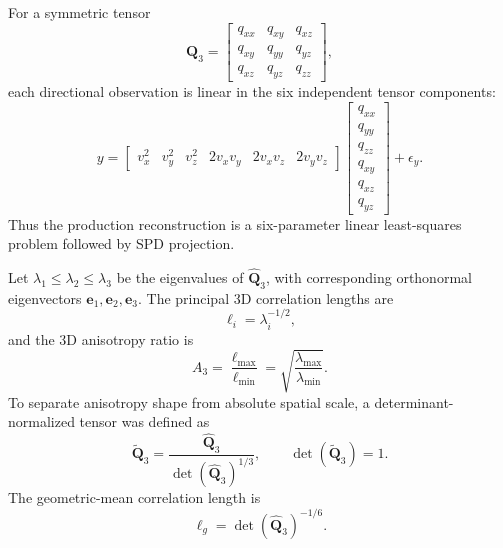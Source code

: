 \documentclass{article}
\begin{document}
For a symmetric tensor
\begin{equation}
    \bm{Q}_{3}
    =
    \begin{bmatrix}
    q_{xx} & q_{xy} & q_{xz}\\
    q_{xy} & q_{yy} & q_{yz}\\
    q_{xz} & q_{yz} & q_{zz}
    \end{bmatrix},
    \label{eq:q3d_matrix}
\end{equation}
each directional observation is linear in the six independent tensor
components:
\begin{equation}
    y
    =
    \begin{bmatrix}
    v_x^2 &
    v_y^2 &
    v_z^2 &
    2v_xv_y &
    2v_xv_z &
    2v_yv_z
    \end{bmatrix}
    \begin{bmatrix}
    q_{xx}\\
    q_{yy}\\
    q_{zz}\\
    q_{xy}\\
    q_{xz}\\
    q_{yz}
    \end{bmatrix}
    +
    \epsilon_y.
    \label{eq:linear_design}
\end{equation}
Thus the production reconstruction is a six-parameter linear least-squares
problem followed by SPD projection.

Let $\lambda_{1}\leq\lambda_{2}\leq\lambda_{3}$ be the eigenvalues of
$\widehat{\bm{Q}}_{3}$, with corresponding orthonormal eigenvectors
$\bm{e}_{1},\bm{e}_{2},\bm{e}_{3}$. The principal 3D correlation lengths are
\begin{equation}
    \ell_{i}
    =
    \lambda_{i}^{-1/2},
    \label{eq:principal_lengths_3d}
\end{equation}
and the 3D anisotropy ratio is
\begin{equation}
    A_{3}
    =
    \frac{\ell_{\max}}{\ell_{\min}}
    =
    \sqrt{
        \frac{\lambda_{\max}}{\lambda_{\min}}
    }.
    \label{eq:anisotropy_3d}
\end{equation}
To separate anisotropy shape from absolute spatial scale, a
determinant-normalized tensor was defined as
\begin{equation}
    \widetilde{\bm{Q}}_{3}
    =
    \frac{
        \widehat{\bm{Q}}_{3}
    }{
        \det(\widehat{\bm{Q}}_{3})^{1/3}
    },
    \qquad
    \det(\widetilde{\bm{Q}}_{3})=1.
    \label{eq:normalized_tensor}
\end{equation}
The geometric-mean correlation length is
\begin{equation}
    \ell_{g}
    =
    \det(\widehat{\bm{Q}}_{3})^{-1/6}.
    \label{eq:geometric_mean_length}
\end{equation}
\end{document}
